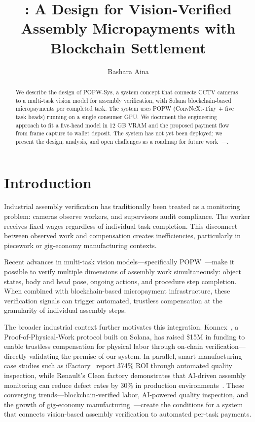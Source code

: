 \documentclass[10pt,twocolumn]{article}
\title{\popwsys{}: A Design for Vision-Verified Assembly Micropayments with Blockchain Settlement}
\author{Bashara Aina}
\date{}
\newcommand{\popw}{POPW}
\newcommand{\popwsys}{POPW-Sys}
\newcommand{\todo}{\textit{---}}
\newcommand{\popwres}{\todo}
\begin{document}
\maketitle

\begin{abstract}
We describe the design of \popwsys{}, a system concept that connects CCTV cameras to a multi-task vision model for assembly verification, with Solana blockchain-based micropayments per completed task. The system uses \popw{} (ConvNeXt-Tiny + five task heads) running on a single consumer GPU. We document the engineering approach to fit a five-head model in 12 GB VRAM and the proposed payment flow from frame capture to wallet deposit. The system has not yet been deployed; we present the design, analysis, and open challenges as a roadmap for future work~\popwres.
\end{abstract}

\FloatBarrier

\section{Introduction}
\label{sec:intro}

Industrial assembly verification has traditionally been treated as a monitoring problem: cameras observe workers, and supervisors audit compliance. The worker receives fixed wages regardless of individual task completion. This disconnect between observed work and compensation creates inefficiencies, particularly in piecework or gig-economy manufacturing contexts.

Recent advances in multi-task vision models---specifically \popw{}~\cite{popw2026}---make it possible to verify multiple dimensions of assembly work simultaneously: object states, body and head pose, ongoing actions, and procedure step completion. When combined with blockchain-based micropayment infrastructure, these verification signals can trigger automated, trustless compensation at the granularity of individual assembly steps.

The broader industrial context further motivates this integration. Konnex~\cite{konnex2026popw}, a Proof-of-Physical-Work protocol built on Solana, has raised \$15M in funding to enable trustless compensation for physical labor through on-chain verification---directly validating the premise of our system. In parallel, smart manufacturing case studies such as iFactory~\cite{zhang2024ifactory} report 374\% ROI through automated quality inspection, while Renault's Cleon factory demonstrates that AI-driven assembly monitoring can reduce defect rates by 30\% in production environments~\cite{renault2023ai}. These converging trends---blockchain-verified labor, AI-powered quality inspection, and the growth of gig-economy manufacturing~\cite{milanez2025algorithmic}---create the conditions for a system that connects vision-based assembly verification to automated per-task payments.
\end{document}
